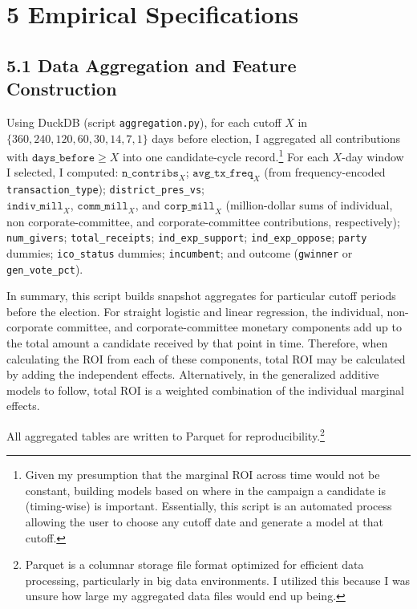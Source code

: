 \section*{5 Empirical Specifications}

\subsection*{5.1 Data Aggregation and Feature Construction}

\indent Using DuckDB (script \texttt{aggregation.py}), for each cutoff $X$ in $\{360, 240, 120, 60, 30, 14, 7, \allowbreak 1\}$ days before election, I aggregated all contributions with $\texttt{days\_before} \ge X$ into one candidate-cycle record.\footnote{Given my presumption that the marginal ROI across time would not be constant, building models based on where in the campaign a candidate is (timing-wise) is important. Essentially, this script is an automated process allowing the user to choose any cutoff date and generate a model at that cutoff.} For each $X$-day window I selected, I computed: \( \texttt{n\_contribs}_{X}\); \(\texttt{avg\_tx\_freq}_{X}\) (from frequency-encoded \texttt{transaction\_type}); \texttt{district\_pres\_vs}; \\ \(\texttt{indiv\_mill}_{X}\), \(\texttt{comm\_mill}_{X}\), and \(\texttt{corp\_mill}_{X}\) (million-dollar sums of individual, non corporate-committee, and corporate-committee contributions, respectively); \texttt{num\_givers}; \texttt{total\_receipts}; \texttt{ind\_exp\_support}; \texttt{ind\_exp\_oppose}; \texttt{party} dummies; \texttt{ico\_status} dummies; \texttt{incumbent}; and outcome (\texttt{gwinner} or \texttt{gen\_vote\_pct}).

In summary, this script builds snapshot aggregates for particular cutoff periods before the election. For straight logistic and linear regression, the individual, non-corporate committee, and corporate-committee monetary components add up to the total amount a candidate received by that point in time. Therefore, when calculating the ROI from each of these components, total ROI may be calculated by adding the independent effects. Alternatively, in the generalized additive models to follow, total ROI is a weighted combination of the individual marginal effects.

All aggregated tables are written to Parquet for reproducibility.\footnote{Parquet is a columnar storage file format optimized for efficient data processing, particularly in big data environments. I utilized this because I was unsure how large my aggregated data files would end up being.}

